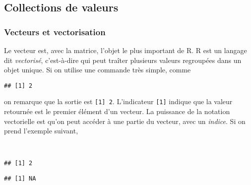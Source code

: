 \subsection{Collections de valeurs}

\subsubsection{Vecteurs et vectorisation}

Le vecteur est, avec la matrice, l'objet le plus important de R.
R est un langage dit \emph{vectorisé}, c'est-à-dire qui peut traîter plusieurs valeurs regroupées dans un objet unique.
Si on utilise une commande très simple, comme

\begin{knitrout}
\color{fgcolor}\begin{kframe}
\begin{flushleft}
\ttfamily\noindent
{}\mbox{}
\normalfont
\end{flushleft}
\begin{verbatim}
## [1] 2
\end{verbatim}
\end{kframe}
\end{knitrout}


\noindent on remarque que la sortie est \texttt{[1] 2}.
L'indicateur \texttt{[1]} indique que la valeur retournée est le premier élément d'un vecteur.
La puissance de la notation vectorielle est qu'on peut accéder à une partie du vecteur, avec un \emph{indice}.
Si on prend l'exemple suivant,

\begin{knitrout}
\color{fgcolor}\begin{kframe}
\begin{flushleft}
\ttfamily\noindent
{}\hlassignement{\usebox{\hlnormalsizeboxlessthan}-}{\ }\hspace*{\fill}\\
\hlstd{}\hlkeyword{[}\hlkeyword{]}\mbox{}
\normalfont
\end{flushleft}
\begin{verbatim}
## [1] 2
\end{verbatim}
\begin{flushleft}
\ttfamily\noindent
{}\hlkeyword{[}\hlkeyword{]}\mbox{}
\normalfont
\end{flushleft}
\begin{verbatim}
## [1] NA
\end{verbatim}
\end{kframe}
\end{knitrout}


